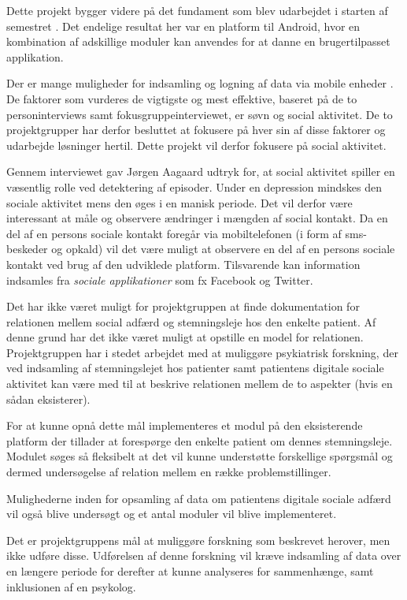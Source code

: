 Dette projekt bygger videre på det fundament som blev udarbejdet i starten af semestret \citefaelles{}.
Det endelige resultat her var en platform til Android, hvor en kombination af adskillige moduler kan anvendes for at danne en brugertilpasset applikation.

Der er mange muligheder  for indsamling og logning af data via mobile enheder .
De faktorer som vurderes de vigtigste og mest effektive, baseret på de to personinterviews samt fokusgruppeinterviewet, er søvn og social aktivitet.
De to projektgrupper har derfor besluttet at fokusere på hver sin af disse faktorer og udarbejde løsninger hertil.
Dette projekt vil derfor fokusere på social aktivitet.

Gennem interviewet  gav Jørgen Aagaard udtryk for, at social aktivitet spiller en væsentlig rolle ved detektering af episoder.
Under en depression mindskes den sociale aktivitet mens den øges i en manisk periode.
Det vil derfor være interessant at måle og observere ændringer i mængden af social kontakt.
Da en del af en persons sociale kontakt foregår via mobiltelefonen (i form af sms-beskeder og opkald) vil det være muligt at observere en del af en persons sociale kontakt ved brug af den udviklede platform.
Tilsvarende kan information indsamles fra \textit{sociale applikationer} som fx Facebook og Twitter.

Det har ikke været muligt for projektgruppen at finde dokumentation for relationen mellem social adfærd og stemningsleje hos den enkelte patient.
Af denne grund har det ikke været muligt at opstille en model for relationen.
Projektgruppen har i stedet arbejdet med at muliggøre psykiatrisk forskning, der ved indsamling af stemningslejet hos patienter samt patientens digitale sociale aktivitet kan være med til at beskrive relationen mellem de to aspekter (hvis en sådan eksisterer).

For at kunne opnå dette mål implementeres et modul på den eksisterende platform \citefaelles{} der tillader at forespørge den enkelte patient om dennes stemningsleje.
Modulet søges så fleksibelt at det vil kunne understøtte forskellige spørgsmål og dermed undersøgelse af relation mellem en række problemstillinger.

Mulighederne inden for opsamling af data om patientens digitale sociale adfærd vil også blive undersøgt og et antal moduler vil blive implementeret.

Det er projektgruppens mål at muliggøre forskning som beskrevet herover, men ikke udføre disse.
Udførelsen af denne forskning vil kræve indsamling af data over en længere periode for derefter at kunne analyseres for sammenhænge, samt inklusionen af en psykolog.